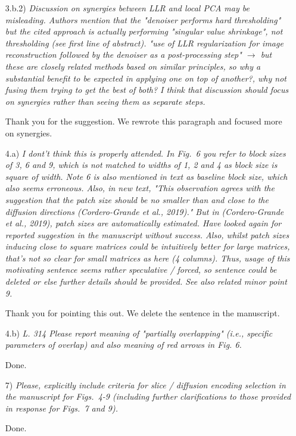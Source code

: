 \documentclass[a4paper,11pt,twoside]{report}
\begin{document}
\begin{enumerate}
    \item [3.b.2)] \textit{Discussion on synergies between LLR and local PCA may be misleading. Authors mention that the "denoiser performs hard thresholding" but the cited approach is actually performing "singular value shrinkage", not thresholding (see first line of abstract). "use of LLR regularization for image reconstruction followed by the denoiser as a post-processing step" $\rightarrow$ but these are closely related methods based on similar principles, so why a substantial benefit to be expected in applying one on top of another?, why not fusing them trying to get the best of both? I think that discussion should focus on synergies rather than seeing them as separate steps.}

    \hspace{1em} {\color{blue} Thank you for the suggestion.
    We rewrote this paragraph and focused more on synergies.}

    \item [4.a)] \textit{I dont't think this is properly attended. In Fig.~6 you refer to block sizes of 3, 6 and 9, which is not matched to widths of 1, 2 and 4 as block size is square of width. Note 6 is also mentioned in text as baseline block size, which also seems erroneous. Also, in new text, "This observation agrees with the suggestion that the patch size should be no smaller than and close to the diffusion directions (Cordero-Grande et al., 2019)." But in (Cordero-Grande et al., 2019), patch sizes are automatically estimated. Have looked again for reported suggestion in the manuscript without success. Also, whilst patch sizes inducing close to square matrices could be intuitively better for large matrices, that's not so clear for small matrices as here (4 columns). Thus, usage of this motivating sentence seems rather speculative / forced, so sentence could be deleted or else further details should be provided. See also related minor point 9.}

    \hspace{1em} {\color{blue} Thank you for pointing this out.
    We delete the sentence in the manuscript.}

    \item [4.b)] \textit{L. 314 Please report meaning of "partially overlapping" (i.e., specific parameters of overlap) and also meaning of red arrows in Fig. 6.}

    \hspace{1em} {\color{blue} Done.}

    \item [7)] \textit{Please, explicitly include criteria for slice / diffusion encoding selection in the manuscript for Figs.~4-9 (including further clarifications to those provided in response for Figs.~7 and 9).}

    \hspace{1em} {\color{blue} Done.}

\end{enumerate}
\end{document}
